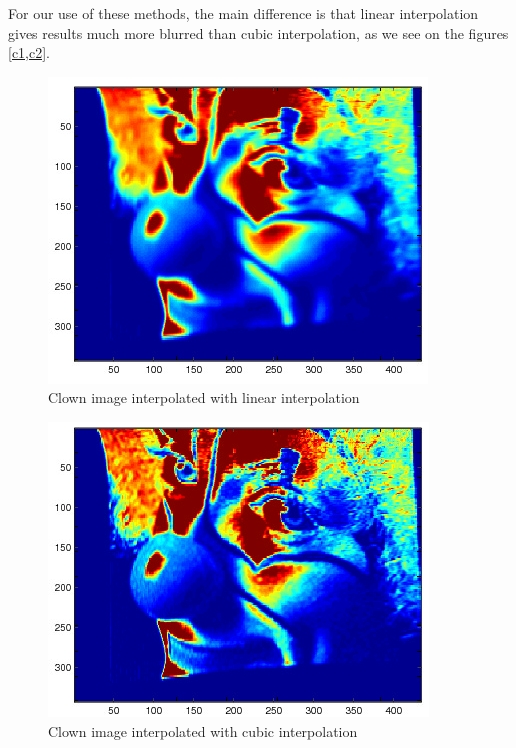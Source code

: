 \documentclass[accepted,single]{gipaper}
\begin{document}
For our use of these methods, the main difference is that linear interpolation gives results much more blurred than cubic interpolation, as we see on the figures \ref{c1,c2}.
\begin{center}
\begin{figure}[h!]
\includegraphics[width=0.8\columnwidth]{25linear.jpg}
\caption{Clown image interpolated with linear interpolation}
\label{c1}
\end{figure}
\begin{figure}[h!]
\includegraphics[width=0.8\columnwidth]{25cubic.jpg}
\caption{Clown image interpolated with cubic interpolation}
\label{c2}
\end{figure}
\end{center}

\end{document}

